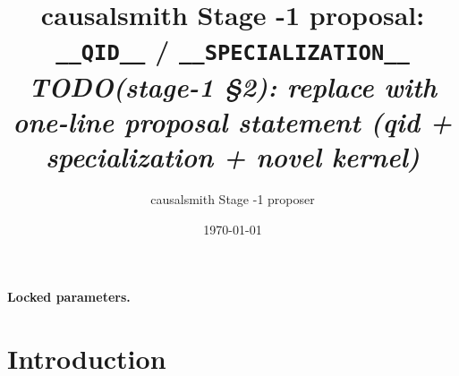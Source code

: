 \documentclass[11pt]{article}
\title{causalsmith Stage -1 proposal: \texttt{__QID__} / \texttt{__SPECIALIZATION__}%
  \\ \large\textit{TODO(stage-1 \S2): replace with one-line proposal statement (qid + specialization + novel kernel)}}
\author{causalsmith Stage -1 proposer}
\date{\today}
\theoremstyle{definition}
\theoremstyle{plain}
\theoremstyle{remark}
\begin{document}
\maketitle


\paragraph{Locked parameters.}

\begin{abstract}
\end{abstract}

\section{Introduction}
%
%
%
%
\end{document}
